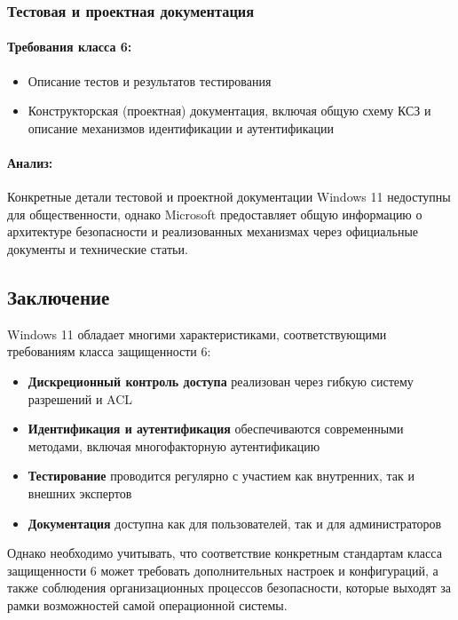 \documentclass[a4paper, 14pt]{report}
\begin{document}
\subsubsection{Тестовая и проектная документация}

\paragraph{Требования класса 6:}
\begin{itemize}
    \item Описание тестов и результатов тестирования
    \item Конструкторская (проектная) документация, включая общую схему КСЗ и описание механизмов идентификации и аутентификации
\end{itemize}

\paragraph{Анализ:}
Конкретные детали тестовой и проектной документации Windows 11 недоступны для общественности, однако Microsoft предоставляет общую информацию о архитектуре безопасности и реализованных механизмах через официальные документы и технические статьи.

\subsection{Заключение}

Windows 11 обладает многими характеристиками, соответствующими требованиям класса защищенности 6:

\begin{itemize}
    \item \textbf{Дискреционный контроль доступа} реализован через гибкую систему разрешений и ACL
    \item \textbf{Идентификация и аутентификация} обеспечиваются современными методами, включая многофакторную аутентификацию
    \item \textbf{Тестирование} проводится регулярно с участием как внутренних, так и внешних экспертов
    \item \textbf{Документация} доступна как для пользователей, так и для администраторов
\end{itemize}

Однако необходимо учитывать, что соответствие конкретным стандартам класса защищенности 6 может требовать дополнительных настроек и конфигураций, а также соблюдения организационных процессов безопасности, которые выходят за рамки возможностей самой операционной системы.
\end{document}
